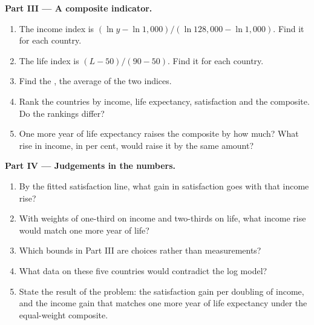 \begin{problem}
\medskip
\noindent\textbf{Part III --- A composite indicator.}
\begin{enumerate}[resume]
\item The income index is $(\ln y - \ln 1{,}000)/(\ln 128{,}000 - \ln 1{,}000)$. Find it for each country.
\item The life index is $(L - 50)/(90 - 50)$. Find it for each country.
\item Find the , the average of the two indices.
\item Rank the countries by income, life expectancy, satisfaction and the composite. Do the rankings differ?
\item One more year of life expectancy raises the composite by how much? What rise in income, in per cent, would raise it by the same amount?
\end{enumerate}

\medskip
\noindent\textbf{Part IV --- Judgements in the numbers.}
\begin{enumerate}[resume]
\item By the fitted satisfaction line, what gain in satisfaction goes with that income rise?
\item With weights of one-third on income and two-thirds on life, what income rise would match one more year of life?
\item Which bounds in Part III are choices rather than measurements?
\item What data on these five countries would contradict the log model?
\item State the result of the problem: the satisfaction gain per doubling of income, and the income gain that matches one more year of life expectancy under the equal-weight
  composite.
\end{enumerate}
\end{problem}
